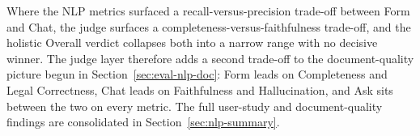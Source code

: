 Where the NLP metrics surfaced a recall-versus-precision trade-off
between Form and Chat, the judge surfaces a
completeness-versus-faithfulness trade-off, and the holistic
Overall verdict collapses both into a narrow range with no
decisive winner. The judge layer therefore adds a second trade-off
to the document-quality picture begun in
Section~\ref{sec:eval-nlp-doc}: Form leads on Completeness and
Legal Correctness, Chat leads on Faithfulness and Hallucination,
and Ask sits between the two on every metric. The full user-study
and document-quality findings are consolidated in
Section~\ref{sec:nlp-summary}.
